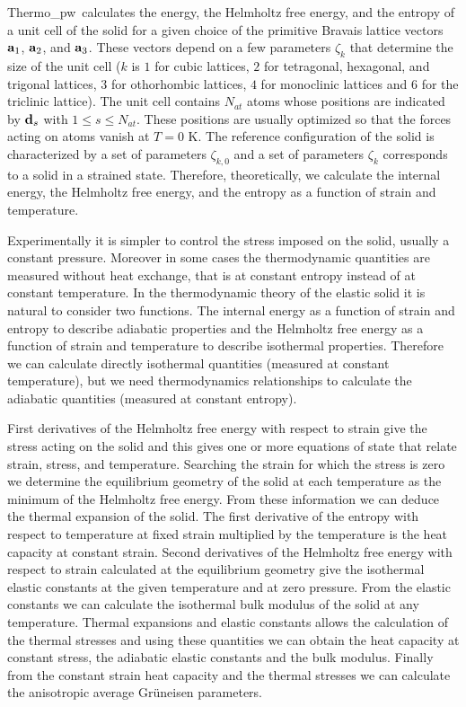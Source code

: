 \documentclass[12pt,a4paper,twoside]{report}
\def\tpw{{\sc Thermo}\_{\sc pw}}
\begin{document}
\tpw\ calculates the energy, the Helmholtz free energy, and the
entropy of a unit cell of the solid for a given choice of the primitive 
Bravais lattice vectors ${\bf a}_1$, ${\bf a}_2$, and ${\bf a}_3$. These
vectors depend on a few parameters $\zeta_k$ that determine the size 
of the unit cell ($k$ is $1$ for cubic lattices, $2$ for tetragonal, hexagonal,
and trigonal lattices, $3$ for othorhombic lattices, $4$ for monoclinic
lattices and $6$ for the triclinic lattice).
The unit cell contains $N_{at}$ atoms
whose positions are indicated by ${\bf d}_s$ with $1\le s\le N_{at}$.
These positions are usually optimized so that the forces acting on atoms 
vanish at $T=0$ K.
The reference configuration of the solid is
characterized by a set of parameters $\zeta_{k,0}$ and a set of parameters 
$\zeta_k$ corresponds to a solid in a strained state.
Therefore, theoretically, we calculate the 
internal energy, the Helmholtz free energy, and the entropy as a 
function of strain and temperature.

Experimentally it is simpler to control the stress imposed on the solid,
usually a constant pressure.
Moreover in some cases the thermodynamic quantities are measured without 
heat exchange, that is at constant entropy instead of at constant temperature. 
In the thermodynamic theory of the elastic solid it is natural to consider two
functions. The internal energy as a function of strain and entropy  
to describe adiabatic properties and the Helmholtz free energy as a function
of strain and temperature to describe isothermal properties.
Therefore we can calculate directly isothermal quantities (measured at constant
temperature), but we need thermodynamics relationships to calculate
the adiabatic quantities (measured at constant entropy).

First derivatives of the Helmholtz free energy with respect to strain
give the stress acting on the solid and this gives one or more equations
of state that relate strain, stress, and temperature. 
Searching the strain for which the stress is zero we determine the 
equilibrium geometry of the solid at each temperature as the minimum of 
the Helmholtz free energy. From these information we can deduce the
thermal expansion of the solid. The first derivative of the entropy 
with respect to temperature at fixed strain multiplied by the temperature
is the heat capacity at constant strain. Second derivatives of the 
Helmholtz free energy with 
respect to strain calculated at the equilibrium geometry give the 
isothermal elastic constants at the given temperature and at zero pressure. 
From the elastic constants we can calculate the isothermal bulk modulus 
of the solid at any temperature. 
Thermal expansions and elastic constants allows the calculation of the thermal
stresses and using these quantities we can obtain the heat capacity at
constant stress, the adiabatic elastic constants and the bulk modulus.
Finally from the constant strain heat capacity and the thermal stresses 
we can calculate the anisotropic average Gr\"uneisen parameters.
\end{document}
